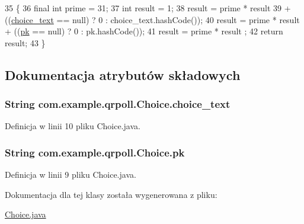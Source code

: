 \begin{DoxyCode}
35                           \{
36         \textcolor{keyword}{final} \textcolor{keywordtype}{int} prime = 31;
37         \textcolor{keywordtype}{int} result = 1;
38         result = prime * result
39                 + ((\hyperlink{classcom_1_1example_1_1qrpoll_1_1_choice_ab336c2005a764a1d28450c206eeb4ed0}{choice\_text} == null) ? 0 : choice\_text.hashCode());
40         result = prime * result + ((\hyperlink{classcom_1_1example_1_1qrpoll_1_1_choice_a6213ee79d3a08c00ca588b9813b7e912}{pk} == null) ? 0 : pk.hashCode());
41         result = prime * result ;
42         \textcolor{keywordflow}{return} result;
43     \}
\end{DoxyCode}


\subsection{Dokumentacja atrybutów składowych}
\hypertarget{classcom_1_1example_1_1qrpoll_1_1_choice_ab336c2005a764a1d28450c206eeb4ed0}{
\subsubsection[{choice\+\_\+text}]{\setlength{\rightskip}{0pt plus 5cm}String com.\+example.\+qrpoll.\+Choice.\+choice\+\_\+text\hspace{0.3cm}{\ttfamily [private]}}}\label{classcom_1_1example_1_1qrpoll_1_1_choice_ab336c2005a764a1d28450c206eeb4ed0}


Definicja w linii 10 pliku Choice.\+java.

\hypertarget{classcom_1_1example_1_1qrpoll_1_1_choice_a6213ee79d3a08c00ca588b9813b7e912}{
\subsubsection[{pk}]{\setlength{\rightskip}{0pt plus 5cm}String com.\+example.\+qrpoll.\+Choice.\+pk\hspace{0.3cm}{\ttfamily [private]}}}\label{classcom_1_1example_1_1qrpoll_1_1_choice_a6213ee79d3a08c00ca588b9813b7e912}


Definicja w linii 9 pliku Choice.\+java.



Dokumentacja dla tej klasy została wygenerowana z pliku\+:\begin{DoxyCompactItemize}
\item 
\hyperlink{_choice_8java}{Choice.\+java}\end{DoxyCompactItemize}
